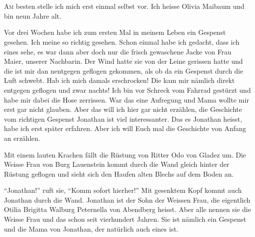 \chapter*{}
\begin{mdframed}[style=mystyle]
\lettrine[lines=3]{\color{red}A}{m} besten stelle ich mich erst einmal selbst vor. Ich heisse Olivia Maibaum und bin neun Jahre alt. 

Vor drei Wochen habe ich zum ersten Mal in meinem Leben ein Gespenst gesehen. Ich meine so richtig gesehen. Schon einmal habe ich gedacht, dass ich eines sehe, es war dann aber doch nur die frisch gewaschene Jacke von Frau Maier, unserer Nachbarin. Der Wind hatte sie von der Leine gerissen hatte und die ist mir dan nentgegen geflogen gekommen, als ob da ein Gespenst durch die Luft schwebt. Hab ich mich damals erschrocken! Die kam mir nämlich direkt entgegen geflogen und zwar nachts! Ich bin vor Schreck vom Fahrrad gestürzt und habe mir dabei die Hose zerrissen.  War das eine Aufregung und Mama wollte mir erst gar nicht glauben. Aber das will ich hier gar nicht erzählen, die Geschichte vom richtigen Gespenst Jonathan ist viel interessanter.  Das es Jonathan heisst, habe ich erst später erfahren. Aber ich will Euch mal die Geschichte von Anfang an erzählen.
\end{mdframed}\medskip

Mit einem lauten Krachen fällt die Rüstung von Ritter Odo von Gladez um. Die Weisse Frau von Burg Lauenstein kommt durch die Wand gleich hinter der Rüstung geflogen und sieht sich den Haufen alten Blechs auf dem Boden an.

\enquote{Jonathan!} ruft sie, \enquote{Komm sofort hierher!} Mit gesenktem Kopf kommt auch Jonathan durch die Wand. Jonathan ist der Sohn der Weissen Frau, die eigentlich Otilia Brigitta Walburg Peternella von Abendberg heisst. Aber alle nennen sie die Weisse Frau und das schon seit vierhundert Jahren. Sie ist nämlich ein Gespenst und die Mama von Jonathan, der natürlich auch eines ist. 

